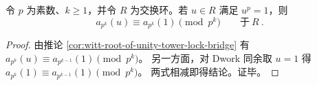 \begin{corollary}\label{cor:witt-cyclotomic-invisibility-bridge}
令 \(p\) 为素数、\(k\ge 1\)，并令 \(R\) 为交换环。若 \(u\in R\) 满足 \(u^p=1\)，则
$$
\boxed{\ a_{p^k}(u)\equiv a_{p^k}(1)\pmod{p^k}\qquad\text{于}\ R\ }.
$$
\end{corollary}
\begin{proof}
由推论 \ref{cor:witt-root-of-unity-tower-lock-bridge} 有
$
a_{p^k}(u)\equiv a_{p^{k-1}}(1)\pmod{p^k}
$。
另一方面，对 Dwork 同余取 \(u=1\) 得
$
a_{p^k}(1)\equiv a_{p^{k-1}}(1)\pmod{p^k}
$。
两式相减即得结论。证毕。
\end{proof}


